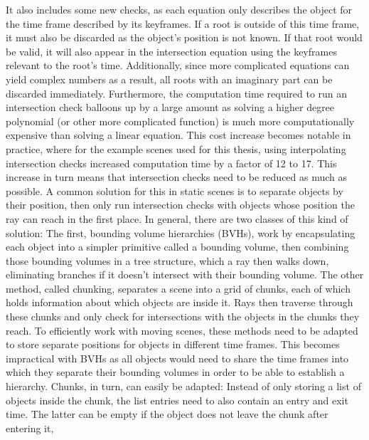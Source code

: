It also includes some new checks,
as each equation only describes the object for the time frame described by its keyframes.
If a root is outside of this time frame,
it must also be discarded as the object's position is not known.
If that root would be valid,
it will also appear in the intersection equation using the keyframes relevant to the root's time.
Additionally, since more complicated equations can yield complex numbers as a result,
all roots with an imaginary part can be discarded immediately.
\newline
Furthermore, the computation time required to run an intersection check
balloons up by a large amount as solving a higher degree polynomial (or other more complicated function)
is much more computationally expensive than solving a linear equation.
This cost increase becomes notable in practice, where for the example scenes used for this thesis,
using interpolating intersection checks increased computation time by a factor of 12 to 17.
\newline
This increase in turn means that intersection checks need to be reduced as much as possible.
A common solution for this in static scenes is to separate objects by their position,
then only run intersection checks with objects whose position the ray can reach in the first place.
\newline
In general, there are two classes of this kind of solution:
The first, bounding volume hierarchies (BVHs), work by encapsulating each object into a simpler primitive called a bounding volume,
then combining those bounding volumes in a tree structure,
which a ray then walks down, eliminating branches if it doesn't intersect with their bounding volume.
The other method, called chunking, separates a scene into a grid of chunks,
each of which holds information about which objects are inside it.
Rays then traverse through these chunks and only check for intersections with the objects in the chunks they reach.
\newline
To efficiently work with moving scenes,
these methods need to be adapted to store separate positions for objects in different time frames.
This becomes impractical with BVHs as all objects would need to share the time frames
into which they separate their bounding volumes in order to be able to establish a hierarchy.
\newline
Chunks, in turn, can easily be adapted:
Instead of only storing a list of objects inside the chunk,
the list entries need to also contain an entry and exit time.
The latter can be empty if the object does not leave the chunk after entering it,
